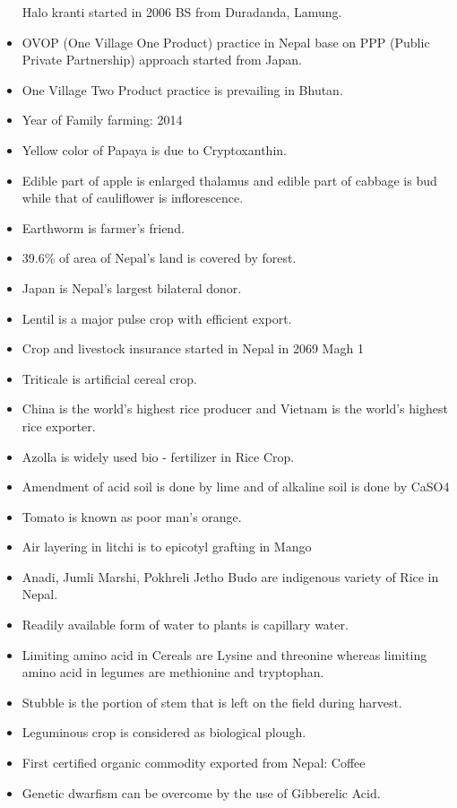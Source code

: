 \documentclass[
  openany]{book}
\begin{document}
\begin{itemize}
  Halo kranti started in 2006 BS from Duradanda, Lamung.
\item
  OVOP (One Village One Product) practice in Nepal base on PPP (Public Private Partnership) approach started from Japan.
\item
  One Village Two Product practice is prevailing in Bhutan.
\item
  Year of Family farming: 2014
\item
  Yellow color of Papaya is due to Cryptoxanthin.
\item
  Edible part of apple is enlarged thalamus and edible part of cabbage is bud while that of cauliflower is inflorescence.
\item
  Earthworm is farmer's friend.
\item
  39.6\% of area of Nepal's land is covered by forest.
\item
  Japan is Nepal's largest bilateral donor.
\item
  Lentil is a major pulse crop with efficient export.
\item
  Crop and livestock insurance started in Nepal in 2069 Magh 1
\item
  Triticale is artificial cereal crop.
\item
  China is the world's highest rice producer and Vietnam is the world's highest rice exporter.
\item
  Azolla is widely used bio - fertilizer in Rice Crop.
\item
  Amendment of acid soil is done by lime and of alkaline soil is done by CaSO4
\item
  Tomato is known as poor man's orange.
\item
  Air layering in litchi is to epicotyl grafting in Mango
\item
  Anadi, Jumli Marshi, Pokhreli Jetho Budo are indigenous variety of Rice in Nepal.
\item
  Readily available form of water to plants is capillary water.
\item
  Limiting amino acid in Cereals are Lysine and threonine whereas limiting amino acid in legumes are methionine and tryptophan.
\item
  Stubble is the portion of stem that is left on the field during harvest.
\item
  Leguminous crop is considered as biological plough.
\item
  First certified organic commodity exported from Nepal: Coffee
\item
  Genetic dwarfism can be overcome by the use of Gibberelic Acid.

\end{itemize}
\end{document}
